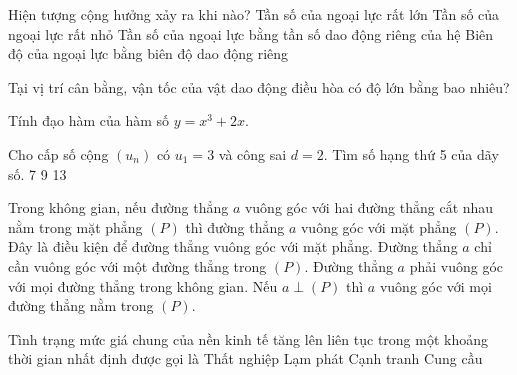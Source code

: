 \begin{ex}
    Hiện tượng cộng hưởng xảy ra khi nào?
    \choice
    {Tần số của ngoại lực rất lớn}
    {Tần số của ngoại lực rất nhỏ}
    {\True Tần số của ngoại lực bằng tần số dao động riêng của hệ}
    {Biên độ của ngoại lực bằng biên độ dao động riêng}

\end{ex}
\begin{ex}
    Tại vị trí cân bằng, vận tốc của vật dao động điều hòa có độ lớn bằng bao nhiêu?
\end{ex}
\begin{ex}
    Tính đạo hàm của hàm số $y = x^3 + 2x$.
\end{ex}
\begin{ex}
    Cho cấp số cộng $(u_n)$ có $u_1 = 3$ và công sai $d = 2$. Tìm số hạng thứ 5 của dãy số.
    \choice
    {7}
    {9}
    {}
    {13}

\end{ex}
\begin{ex}
    Trong không gian, nếu đường thẳng $a$ vuông góc với hai đường thẳng cắt nhau nằm trong mặt phẳng $(P)$ thì đường thẳng $a$ vuông góc với mặt phẳng $(P)$.
    \choiceTF
    {\True Đây là điều kiện để đường thẳng vuông góc với mặt phẳng.}
    {Đường thẳng $a$ chỉ cần vuông góc với một đường thẳng trong $(P)$.}
    {Đường thẳng $a$ phải vuông góc với mọi đường thẳng trong không gian.}
    {\True Nếu $a \perp (P)$ thì $a$ vuông góc với mọi đường thẳng nằm trong $(P)$.}

\end{ex}
\begin{ex}
    Tình trạng mức giá chung của nền kinh tế tăng lên liên tục trong một khoảng thời gian nhất định được gọi là
    \choice
    {Thất nghiệp}
    {\True Lạm phát}
    {Cạnh tranh}
    {Cung cầu}

\end{ex}
